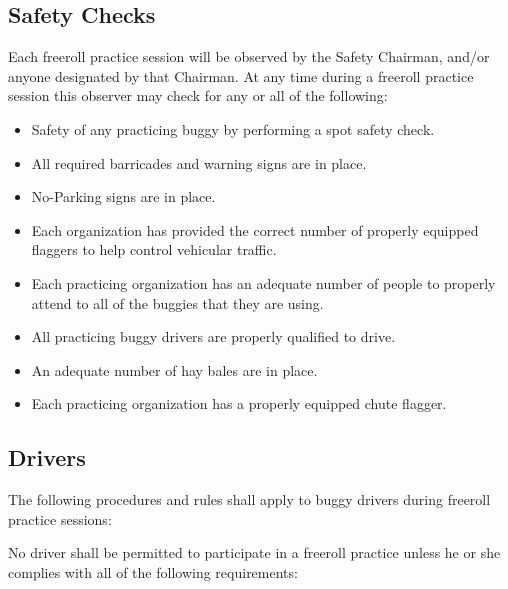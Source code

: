 \subsection{Safety Checks}

	Each freeroll practice session will be observed by the Safety Chairman, and/or
	anyone designated by that Chairman. At any time during a freeroll practice
	session this observer may check for any or all of the following:

	\begin{itemize}

		\item Safety of any practicing buggy by performing a spot safety check.

		\item All required barricades and warning signs are in place.

		\item No-Parking signs are in place.

		\item Each organization has provided the correct number of
		properly equipped flaggers to help control vehicular traffic.

		\item Each practicing organization has an adequate number of
		people to properly attend to all of the buggies that they are using.

		\item All practicing buggy drivers are properly qualified to
		drive.

		\item An adequate number of hay bales are in place.

		\item Each practicing organization has a properly equipped chute flagger.

	\end{itemize}

\subsection{Drivers}

	The following procedures and rules shall apply to buggy drivers during freeroll
	practice sessions:
	\newline

	\noindent No driver shall be permitted to participate in a freeroll practice unless he or
	she complies with all of the following requirements:


